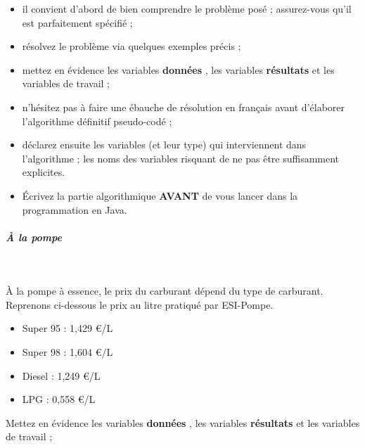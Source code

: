 \documentclass[11pt,a4paper]{article}
\begin{document}
					\begin{itemize}
				
			\item il convient d'abord de bien comprendre le probl\`eme pos\'e ; assurez-vous qu'il est parfaitement sp\'ecifi\'e ;
			\item r\'esolvez le probl\`eme via quelques exemples pr\'ecis ;
			\item mettez en \'evidence les variables \textbf{\guillemotleft  donn\'ees \guillemotright }, les variables \textbf{\guillemotleft  r\'esultats \guillemotright } et les variables de travail ;
			\item n'h\'esitez pas \`a faire une \'ebauche de r\'esolution en fran\c cais avant d'\'elaborer l'algorithme d\'efinitif pseudo-cod\'e ;
			\item d\'eclarez ensuite les variables (et leur type) qui interviennent dans l'algorithme ; les noms des variables risquant de ne pas \^etre suffisamment explicites.
			\item \'Ecrivez la partie algorithmique \textbf{AVANT} de vous lancer dans la programmation en Java.
					\end{itemize}
				
            \par
        
			
		\subparagraph{\`A la pompe} 
		
					\textcolor{white}{.} \par
				
          \`A la pompe \`a essence, le prix du carburant d\'epend du type de carburant. Reprenons ci-dessous le prix au litre pratiqu\'e par ESI-Pompe. 
          
					\begin{itemize}
				
			\item Super 95 : 1,429 €/L
			\item Super 98 : 1,604 €/L
			\item Diesel : 1,249 €/L
			\item LPG : 0,558 €/L
					\end{itemize}
				
            \par
        
        Mettez en \'evidence les variables \textbf{\guillemotleft  donn\'ees \guillemotright }, 
        les variables \textbf{\guillemotleft  r\'esultats \guillemotright } et les variables de travail ;
      
            \par
        
\end{document}
